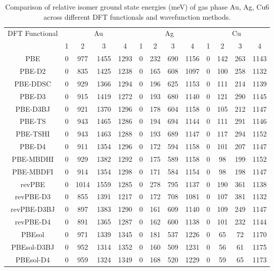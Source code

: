 \begin{table}[ht]
\centering
\caption{Comparison of relative isomer ground state energies (meV) of gas phase Au, Ag, Cu6 across different DFT functionals and wavefunction methods.}
\begin{tabular}{ccccccccccccc}
\hline\hline
DFT Functional & \multicolumn{4}{c}{Au} & \multicolumn{4}{c}{Ag} & \multicolumn{4}{c}{Cu} \\ 
\cline{2-13}
 & 1 & 2 & 3 & 4 & 1 & 2 & 3 & 4 & 1 & 2 & 3 & 4 \\ \hline
PBE & 0 & 977 & 1455 & 1293 & 0 & 232 & 690 & 1156 & 0 & 142 & 263 & 1143 \\ 
PBE-D2 & 0 & 835 & 1425 & 1238 & 0 & 165 & 608 & 1097 & 0 & 100 & 258 & 1132 \\ 
PBE-DDSC & 0 & 929 & 1366 & 1294 & 0 & 196 & 625 & 1153 & 0 & 111 & 214 & 1139 \\ 
PBE-D3 & 0 & 915 & 1419 & 1272 & 0 & 193 & 680 & 1140 & 0 & 121 & 290 & 1145 \\ 
PBE-D3BJ & 0 & 921 & 1370 & 1296 & 0 & 178 & 604 & 1158 & 0 & 105 & 212 & 1147 \\ 
PBE-TS & 0 & 943 & 1465 & 1286 & 0 & 194 & 694 & 1144 & 0 & 111 & 291 & 1146 \\ 
PBE-TSHI & 0 & 943 & 1463 & 1288 & 0 & 193 & 689 & 1147 & 0 & 117 & 294 & 1152 \\ 
PBE-D4 & 0 & 911 & 1354 & 1296 & 0 & 172 & 594 & 1158 & 0 & 101 & 207 & 1147 \\ 
PBE-MBDHI & 0 & 929 & 1382 & 1292 & 0 & 175 & 589 & 1158 & 0 & 98 & 199 & 1152 \\ 
PBE-MBDFI & 0 & 914 & 1354 & 1298 & 0 & 171 & 584 & 1154 & 0 & 98 & 198 & 1147 \\ 
revPBE & 0 & 1014 & 1559 & 1285 & 0 & 278 & 795 & 1137 & 0 & 190 & 361 & 1138 \\ 
revPBE-D3 & 0 & 855 & 1391 & 1217 & 0 & 172 & 708 & 1081 & 0 & 107 & 381 & 1132 \\ 
revPBE-D3BJ & 0 & 897 & 1383 & 1290 & 0 & 161 & 609 & 1140 & 0 & 109 & 249 & 1147 \\ 
revPBE-D4 & 0 & 891 & 1365 & 1287 & 0 & 162 & 600 & 1138 & 0 & 101 & 232 & 1144 \\ 
PBEsol & 0 & 971 & 1339 & 1345 & 0 & 181 & 537 & 1226 & 0 & 65 & 72 & 1170 \\ 
PBEsol-D3BJ & 0 & 952 & 1314 & 1352 & 0 & 160 & 509 & 1231 & 0 & 56 & 61 & 1175 \\ 
PBEsol-D4 & 0 & 959 & 1324 & 1349 & 0 & 168 & 520 & 1229 & 0 & 59 & 65 & 1173 \\ 

\end{tabular}
\end{table}
